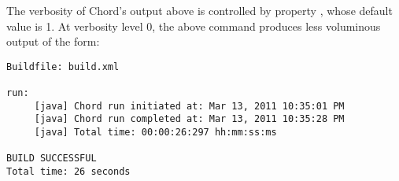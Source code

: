 The verbosity of Chord's output above is controlled by property
, whose default value is 1.  At verbosity level 0, the
above command produces less voluminous output of the form:

\begin{framed}
{\small
\begin{verbatim}
Buildfile: build.xml

run:
     [java] Chord run initiated at: Mar 13, 2011 10:35:01 PM
     [java] Chord run completed at: Mar 13, 2011 10:35:28 PM
     [java] Total time: 00:00:26:297 hh:mm:ss:ms

BUILD SUCCESSFUL
Total time: 26 seconds
\end{verbatim}
}
\end{framed}

